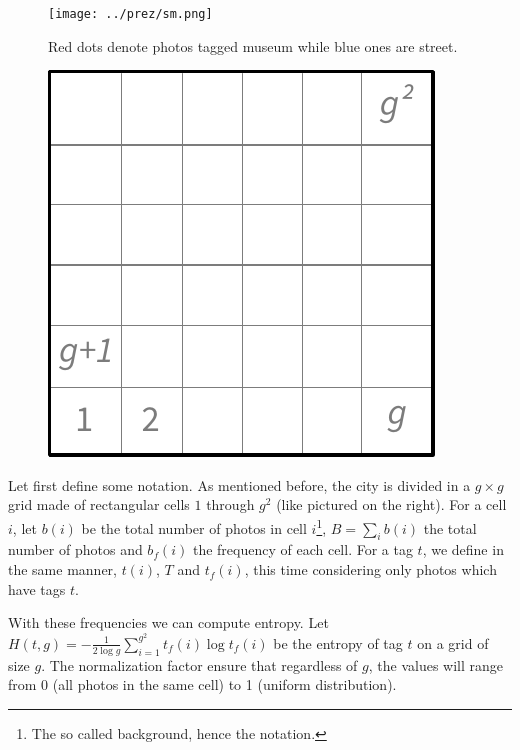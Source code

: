 \begin{figure}[hbtp]
\texttt{[image: ../prez/sm.png]}
\caption{Red dots denote photos tagged \textsf{museum} while blue ones are
	\textsf{street}.\label{f:sm}}
\end{figure}

\begin{figure}
\centering
\vspace{-.6\baselineskip}
\includegraphics[width=0.15\columnwidth]{grid}
\end{figure}
Let first define some notation. As mentioned before, the city is divided in a
$g\times g$ grid made of rectangular cells $1$ through $g^2$ (like pictured on
the right).  For a cell $i$, let $b(i)$ be the total number of photos in cell
$i$\footnote{The so called background, hence the notation.}, $B=\sum_i b(i)$
the total number of photos and $b_f(i)$ the frequency of each cell. For a tag
$t$, we define in the same manner, $t(i)$, $T$ and $t_f(i)$, this time
considering only photos which have tags $t$.

With these frequencies we can compute entropy. Let $H(t,g) = -\frac{1}{2\log
g}\sum_{i=1}^{g^2} t_f(i)\log t_f(i)$ be the entropy of tag $t$ on a grid of
size $g$. The normalization factor ensure that regardless of $g$, the values
will range from 0 (all photos in the same cell) to 1 (uniform distribution).

